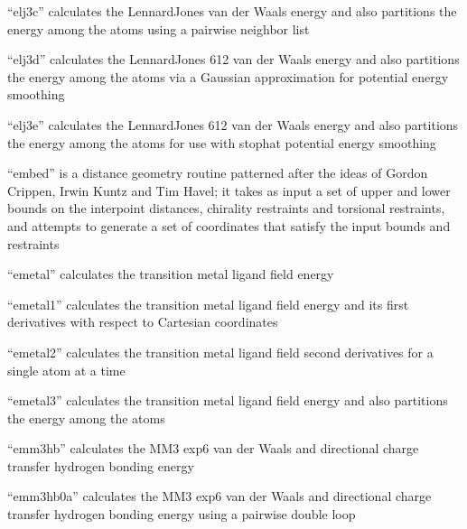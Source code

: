 \documentclass[letterpaper,11pt,english]{sphinxmanual}
\begin{document}

“elj3c” calculates the Lennard\sphinxhyphen{}Jones van der Waals energy
and also partitions the energy among the atoms using a
pairwise neighbor list


“elj3d” calculates the Lennard\sphinxhyphen{}Jones 6\sphinxhyphen{}12 van der Waals energy
and also partitions the energy among the atoms via a Gaussian
approximation for potential energy smoothing


“elj3e” calculates the Lennard\sphinxhyphen{}Jones 6\sphinxhyphen{}12 van der Waals energy
and also partitions the energy among the atoms for use with
stophat potential energy smoothing


“embed” is a distance geometry routine patterned after the
ideas of Gordon Crippen, Irwin Kuntz and Tim Havel; it takes
as input a set of upper and lower bounds on the interpoint
distances, chirality restraints and torsional restraints,
and attempts to generate a set of coordinates that satisfy
the input bounds and restraints


“emetal” calculates the transition metal ligand field energy


“emetal1” calculates the transition metal ligand field energy
and its first derivatives with respect to Cartesian coordinates


“emetal2” calculates the transition metal ligand field second
derivatives for a single atom at a time


“emetal3” calculates the transition metal ligand field energy
and also partitions the energy among the atoms


“emm3hb” calculates the MM3 exp\sphinxhyphen{}6 van der Waals and directional
charge transfer hydrogen bonding energy


“emm3hb0a” calculates the MM3 exp\sphinxhyphen{}6 van der Waals and
directional charge transfer hydrogen bonding energy using
a pairwise double loop
\end{document}
